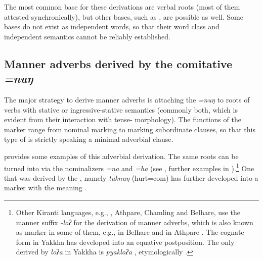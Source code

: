 The most common base for these derivations are verbal roots (most of them attested synchronically), but other bases, such  as , are possible as well. Some bases do not exist as independent words, so  that their word class and independent semantics cannot be reliably established. 

\subsection{Manner adverbs derived by the comitative \emph{=nuŋ}}
 
The major strategy to derive manner adverbs is attaching the    \emph{=nuŋ} to roots of verbs with stative or ingressive-stative semantics (commonly both, which is evident from their interaction with tense- morphology). The functions of the  marker range from nominal  marking to marking subordinate clauses, so that this type of  is strictly speaking a minimal adverbial clause.

 provides some examples of this adverbial derivation. The same roots can be turned  into  via the nominalizers \emph{=na} and \emph{=ha} (see \Next, further examples in ).\footnote{Other Kiranti languages, e.g., , Athpare, Chamling and Belhare, use the manner suffix \emph{-loʔ} for the derivation of manner adverbs, which is also known as   marker in some of them, e.g., in Belhare \citep[549]{Bickel2003Belhare} and in Athpare \citep[81]{Ebert1994The-structure}. The cognate form in Yakkha has developed into an equative postposition. The only  derived by \emph{loʔa} in Yakkha is \emph{pyakloʔa} , etymologically .}  One  that was derived by the , namely \emph{tuknuŋ} (hurt={\sc com}) has further developed into a  marker with the meaning . 
 
